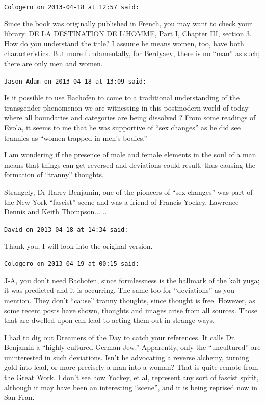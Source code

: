\begin{footnotesize}
\begin{sffamily}
\hfill

\texttt{Cologero on 2013-04-18 at 12:57 said:}

Since the book was originally published in French, you may want to check your library. DE LA DESTINATION DE L'HOMME, Part I, Chapter III, section 3. How do you understand the title? I assume he means women, too, have both characteristics. But more fundamentally, for Berdyaev, there is no ``man'' as such; there are only men and women.

\hfill

\texttt{Jason-Adam on 2013-04-18 at 13:09 said:}

Is it possible to use Bachofen to come to a traditional understanding of the transgender phenomenon we are witnessing in this postmodern world of today where all boundaries and categories are being dissolved ? From some readings of Evola, it seems to me that he was supportive of ``sex changes'' as he did see trannies as ``women trapped in men's bodies.''

I am wondering if the presence of male and female elements in the soul of a man means that things can get reversed and deviations could result, thus causing the formation of ``tranny'' thoughts.

Strangely, Dr Harry Benjamin, one of the pioneers of ``sex changes'' was part of the New York ``fascist'' scene and was a friend of Francis Yockey, Lawrence Dennis and Keith Thompson... ... 

\hfill

\texttt{David on 2013-04-18 at 14:34 said:}

Thank you, I will look into the original version.

\hfill

\texttt{Cologero on 2013-04-19 at 00:15 said:}

J-A, you don't need Bachofen, since formlessness is the hallmark of the kali yuga; it was predicted and it is occurring. The same too for ``deviations'' as you mention. They don't ``cause'' tranny thoughts, since thought is free. However, as some recent posts have shown, thoughts and images arise from all sources. Those that are dwelled upon can lead to acting them out in strange ways.

I had to dig out Dreamers of the Day to catch your references. It calls Dr. Benjamin a ``highly cultured German Jew.'' Apparently, only the ``uncultured'' are uninterested in such deviations. Isn't he advocating a reverse alchemy, turning gold into lead, or more precisely a man into a woman? That is quite remote from the Great Work. I don't see how Yockey, et al, represent any sort of fascist spirit, although it may have been an interesting ``scene'', and it is being reprised now in San Fran.


\end{sffamily}
\end{footnotesize}

